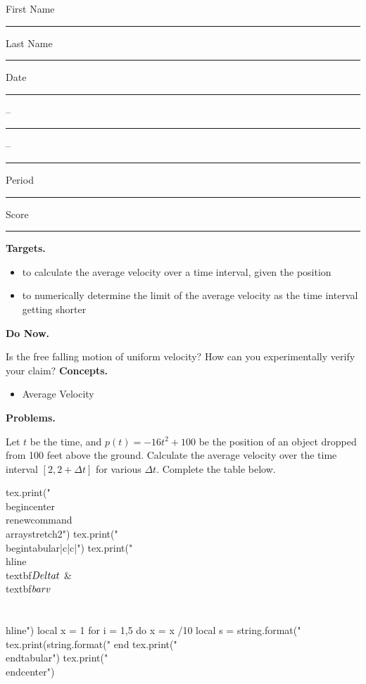 \documentclass[twoside, 10pt]{article}
\title{}
\date{}
\begin{document}
\noindent
{\large
First Name \rule{6em}{.1pt}Last Name \rule{6em}{.1pt} Date \rule{1.5em}{.1pt} -- \rule{1.5em}{.1pt} -- \rule{1.5em}{.1pt} Period \rule{2em}{.1pt} Score \rule{2em}{.1pt}
}
\vspace{1em}

{\noindent\bf Targets.}
\begin{itemize}
    \item to calculate the average velocity over a time interval, given the position
    \item to numerically determine the limit of the average velocity as the time interval getting shorter
\end{itemize}
{\noindent\bf Do Now.}

Is the free falling motion of uniform velocity? How can you experimentally verify your claim?
{\noindent\bf Concepts.}
\begin{itemize}
\item
Average Velocity
\end{itemize}

{\noindent\bf Problems.}

Let $t$ be the time, and $p(t) = -16t^2 + 100$ be the position of an object dropped from 100 feet above the ground. Calculate the average velocity over the time interval $[2, 2+\Delta t]$ for various $\Delta t$. Complete the table below.
\vspace{1em}

\begin{luacode*}
tex.print("\\begin{center}\\renewcommand{\\arraystretch}{2}")
tex.print("\\begin{tabular}{|c|c|}")
tex.print("\\hline\\textbf{$\\Delta t$} & \\textbf{$\\bar{v}$} \\\\ \\hline")
local x = 1
for i = 1,5 do
  x = x /10
  local s = string.format("%
  tex.print(string.format("%
end
tex.print("\\end{tabular}")
tex.print("\\end{center}")
\end{luacode*}
\vspace{1em}
\end{document}
